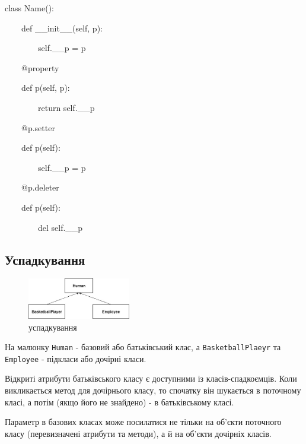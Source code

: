 \begin{frame}
class Name():

~~~~def \_\_init\_\_(self, p):

~~~~~~~~self.\_\_p = p

~~~~@property

~~~~def p(self, p):

~~~~~~~~return self.\_\_p

~~~~@p.setter

~~~~def p(self):

~~~~~~~~self.\_\_p = p

~~~~@p.deleter

~~~~def p(self):

~~~~~~~~del self.\_\_p

\end{frame}

\subsection{Успадкування} 
\begin{frame}
\begin{figure}
\begin{center}
 \includegraphics[width=0.4\textwidth]{pictures/inheritance.jpg}
\caption{успадкування}
\label{inheritance} 
\end{center}
\end{figure}

На малюнку \texttt{Human} - базовий або батьківський клас, а \texttt{BasketballPlaeyr} та \texttt{Employee} - підкласи або дочірні класи.

\end{frame}

\begin{frame}

Відкриті атрибути батьківського класу є доступними із класів-спадкоємців. Коли викликається метод для дочірнього класу, то спочатку він шукається в поточному класі, а потім (якщо його не знайдено) - в батьківському класі. 

Параметр в базових класах може посилатися не тільки на об'єкти поточного класу (перевизначені атрибути та методи), а й на об'єкти дочірніх класів.  

\end{frame}

